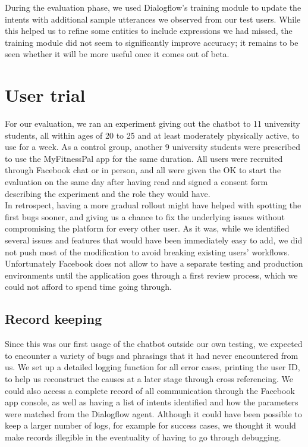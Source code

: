 During the evaluation phase, we used Dialogflow's training module to update the intents with additional sample utterances we observed from our test users. While this helped us to refine some entities to include expressions we had missed, the training module did not seem to significantly improve accuracy; it remains to be seen whether it will be more useful once it comes out of beta.
\section{User trial}
For our evaluation, we ran an experiment giving out the chatbot to 11 university students, all within ages of 20 to 25 and at least moderately physically active, to use for a week. As a control group, another 9 university students were prescribed to use the MyFitnessPal app for the same duration. All users were recruited through Facebook chat or in person, and all were given the OK to start the evaluation on the same day after having read and signed a consent form describing the experiment and the role they would have. \\
In retrospect, having a more gradual rollout might have helped with spotting the first bugs sooner, and giving us a chance to fix the underlying issues without compromising the platform for every other user. As it was, while we identified several issues and features that would have been immediately easy to add, we did not push most of the modification to avoid breaking existing users' workflows. Unfortunately Facebook does not allow to have a separate testing and production environments until the application goes through a first review process, which we could not afford to spend time going through.
\subsection{Record keeping}
Since this was our first usage of the chatbot outside our own testing, we expected to encounter a variety of bugs and phrasings that it had never encountered from us. We set up a detailed logging function for all error cases, printing the user ID, to help us reconstruct the causes at a later stage through cross referencing. We could also access a complete record of all communication through the Facebook app console, as well as having a list of intents identified and how the parameters were matched from the Dialogflow agent. Although it could have been possible to keep a larger number of logs, for example for success cases, we thought it would make records illegible in the eventuality of having to go through debugging.

